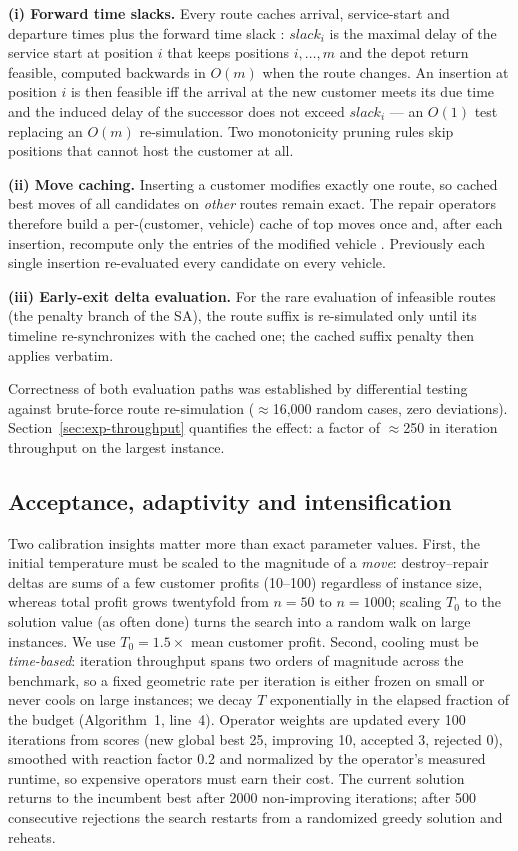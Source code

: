 \documentclass[10pt, a4paper]{article}
\begin{document}
\textbf{(i) Forward time slacks.} Every route caches arrival, service-start
and departure times plus the forward time slack \cite{savelsbergh1992}:
$\mathit{slack}_i$ is the maximal delay of the service start at position $i$
that keeps positions $i,\dots,m$ and the depot return feasible, computed
backwards in $O(m)$ when the route changes. An insertion at position $i$ is
then feasible iff the arrival at the new customer meets its due time and the
induced delay of the successor does not exceed $\mathit{slack}_i$ --- an
$O(1)$ test replacing an $O(m)$ re-simulation. Two monotonicity pruning rules
skip positions that cannot host the customer at all.

\textbf{(ii) Move caching.} Inserting a customer modifies exactly one route,
so cached best moves of all candidates on \emph{other} routes remain exact.
The repair operators therefore build a per-(customer, vehicle) cache of top
moves once and, after each insertion, recompute only the entries of the
modified vehicle \cite{ropke2006}. Previously each single insertion
re-evaluated every candidate on every vehicle.

\textbf{(iii) Early-exit delta evaluation.} For the rare evaluation of
infeasible routes (the penalty branch of the SA), the route suffix is
re-simulated only until its timeline re-synchronizes with the cached one;
the cached suffix penalty then applies verbatim.

Correctness of both evaluation paths was established by differential testing
against brute-force route re-simulation ($\approx$16{,}000 random cases, zero
deviations). Section~\ref{sec:exp-throughput} quantifies the effect: a factor
of $\approx$250 in iteration throughput on the largest instance.

\subsection{Acceptance, adaptivity and intensification}
Two calibration insights matter more than exact parameter values. First,
the initial temperature must be scaled to the magnitude of a \emph{move}:
destroy--repair deltas are sums of a few customer profits (10--100)
regardless of instance size, whereas total profit grows twentyfold from
$n{=}50$ to $n{=}1000$; scaling $T_0$ to the solution value (as often done)
turns the search into a random walk on large instances. We use
$T_0 = 1.5\times$ mean customer profit. Second, cooling must be
\emph{time-based}: iteration throughput spans two orders of magnitude across
the benchmark, so a fixed geometric rate per iteration is either frozen on
small or never cools on large instances; we decay $T$ exponentially in the
elapsed fraction of the budget (Algorithm~1, line~4).
Operator weights are updated every 100 iterations from scores (new global
best 25, improving 10, accepted 3, rejected 0), smoothed with reaction factor
0.2 and normalized by the operator's measured runtime, so expensive operators
must earn their cost. The current solution returns to the incumbent best
after 2000 non-improving iterations; after 500 consecutive rejections the
search restarts from a randomized greedy solution and reheats.
\end{document}
